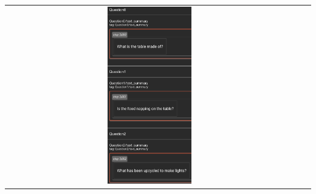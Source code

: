 \documentclass{article}
\begin{document}
\begin{tabular}{ccc}
    \includegraphics[width=0.3\textwidth]{q2.6_10.png} \\
\end{tabular}
\end{document}
